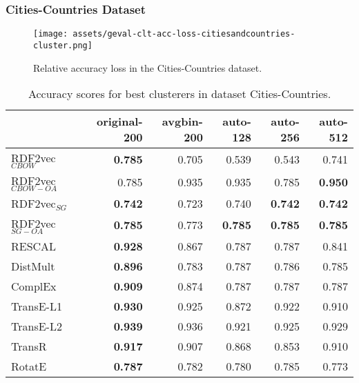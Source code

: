 \documentclass[11pt,titlepage,oneside,openany]{book}
\begin{document}
\newpage

\subsubsection{Cities-Countries Dataset}
\label{subsubsec:geval-results-clt-citiesandcountries-cluster}


\begin{figure}[H]
    \centering
    \texttt{[image: assets/geval-clt-acc-loss-citiesandcountries-cluster.png]}
    \vspace*{-3mm}
    \caption{Relative accuracy loss in the Cities-Countries dataset.}
    \label{fig:geval-clt-acc-loss-citiesandcountries-cluster}
\end{figure}


\begin{table}[H]
\centering
\begin{tabular}{lrrrrr}
\toprule
{} &  original-200 &  avgbin-200 &  auto-128 &  auto-256 &  auto-512 \\
\midrule
RDF2vec$_{CBOW}$     &	\textbf{0.785} &       0.705  &     0.539  &     0.543  &     0.741  \\
RDF2vec$_{CBOW-OA}$  &         0.785  &       0.935  &     0.935  &     0.785  &	\textbf{0.950} \\
RDF2vec$_{SG}$       &	\textbf{0.742} &       0.723  &     0.740  &	\textbf{0.742} &	\textbf{0.742} \\
RDF2vec$_{SG-OA}$    &	\textbf{0.785} &       0.773  &	\textbf{0.785} &	\textbf{0.785} &	\textbf{0.785} \\
RESCAL               &	\textbf{0.928} &       0.867  &     0.787  &     0.787  &     0.841  \\
DistMult             &	\textbf{0.896} &       0.783  &     0.787  &     0.786  &     0.785  \\
ComplEx              &	\textbf{0.909} &       0.874  &     0.787  &     0.787  &     0.787  \\
TransE-L1            &	\textbf{0.930} &       0.925  &     0.872  &     0.922  &     0.910  \\
TransE-L2            &	\textbf{0.939} &       0.936  &     0.921  &     0.925  &     0.929  \\
TransR               &	\textbf{0.917} &       0.907  &     0.868  &     0.853  &     0.910  \\
RotatE               &	\textbf{0.787} &       0.782  &     0.780  &     0.785  &     0.773  \\
\bottomrule
\end{tabular}
\caption{Accuracy scores for best clusterers in dataset Cities-Countries.}
\label{tab:geval-clt-acc-citiesandcountries-cluster}
\end{table}
\end{document}

